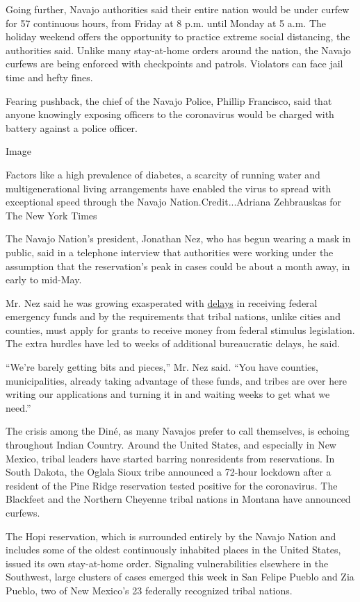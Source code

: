 Going further, Navajo authorities said their entire nation would be
under curfew for 57 continuous hours, from Friday at 8 p.m. until Monday
at 5 a.m. The holiday weekend offers the opportunity to practice extreme
social distancing, the authorities said. Unlike many stay-at-home orders
around the nation, the Navajo curfews are being enforced with
checkpoints and patrols. Violators can face jail time and hefty fines.

Fearing pushback, the chief of the Navajo Police, Phillip Francisco,
said that anyone knowingly exposing officers to the coronavirus would be
charged with battery against a police officer.

Image

Factors like a high prevalence of diabetes, a scarcity of running water
and multigenerational living arrangements have enabled the virus to
spread with exceptional speed through the Navajo Nation.Credit...Adriana
Zehbrauskas for The New York Times

The Navajo Nation's president, Jonathan Nez, who has begun wearing a
mask in public, said in a telephone interview that authorities were
working under the assumption that the reservation's peak in cases could
be about a month away, in early to mid-May.

Mr. Nez said he was growing exasperated with
\href{https://www.politico.com/news/2020/03/20/coronavirus-american-indian-health-138724}{delays}
in receiving federal emergency funds and by the requirements that tribal
nations, unlike cities and counties, must apply for grants to receive
money from federal stimulus legislation. The extra hurdles have led to
weeks of additional bureaucratic delays, he said.

``We're barely getting bits and pieces,'' Mr. Nez said. ``You have
counties, municipalities, already taking advantage of these funds, and
tribes are over here writing our applications and turning it in and
waiting weeks to get what we need.''

The crisis among the Diné, as many Navajos prefer to call themselves, is
echoing throughout Indian Country. Around the United States, and
especially in New Mexico, tribal leaders have started barring
nonresidents from reservations. In South Dakota, the Oglala Sioux tribe
announced a 72-hour lockdown after a resident of the Pine Ridge
reservation tested positive for the coronavirus. The Blackfeet and the
Northern Cheyenne tribal nations in Montana have announced curfews.

The Hopi reservation, which is surrounded entirely by the Navajo Nation
and includes some of the oldest continuously inhabited places in the
United States, issued its own stay-at-home order. Signaling
vulnerabilities elsewhere in the Southwest, large clusters of cases
emerged this week in San Felipe Pueblo and Zia Pueblo, two of New
Mexico's 23 federally recognized tribal nations.

